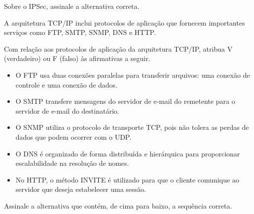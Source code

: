 \documentclass[10pt,a4paper]{article}
\begin{document}
%
{
\def\AMCbeginQuestion#1#2{\par\noindent{\bf (POSCOMP 2013 - Questão 63)}}
\begin{question}{} Sobre o IPSec, assinale a alternativa correta.
\begin{choices}
\end{choices}
\end{question}
}
%
{
\def\AMCbeginQuestion#1#2{\par\noindent{\bf (POSCOMP 2013 - Questão 65)}}
\begin{question}{} A arquitetura TCP/IP inclui protocolos de aplicação que fornecem importantes serviços como FTP, SMTP, SNMP, DNS e HTTP.

Com relação aos protocolos de aplicação da arquitetura TCP/IP, atribua V (verdadeiro) ou F (falso) às afirmativas a seguir.
\begin{itemize}[label={(\ )}]
\item O FTP usa duas conexões paralelas para transferir arquivos: uma conexão de controle e uma conexão de dados.
\item O SMTP transfere mensagens do servidor de e-mail do remetente para o servidor de e-mail do destinatário.
\item O SNMP utiliza o protocolo de transporte TCP, pois não tolera as perdas de dados que podem ocorrer com o UDP.
\item O DNS é organizado de forma distribuída e hierárquica para proporcionar escalabilidade na resolução de nomes.
\item No HTTP, o método INVITE é utilizado para que o cliente comunique ao servidor que deseja estabelecer uma sessão.
\end{itemize}
Assinale a alternativa que contém, de cima para baixo, a sequência correta.
\begin{choices}
\end{choices}
\end{question}
}
\end{document}
